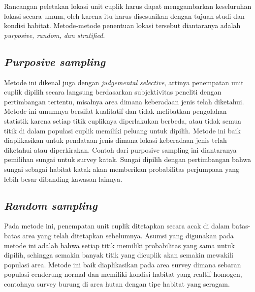 \documentclass[
  oneside]{book}
\begin{document}
Rancangan peletakan lokasi unit cuplik harus dapat menggambarkan keseluruhan lokasi secara umum, oleh karena itu harus disesuaikan dengan tujuan studi dan kondisi habitat. Metode-metode penentuan lokasi tersebut diantaranya adalah \emph{purposive, random, dan stratified}.

\hypertarget{purposive-sampling}{%
\subsection*{\texorpdfstring{\emph{Purposive sampling}}{Purposive sampling}}\label{purposive-sampling}}

Metode ini dikenal juga dengan \emph{judgemental selective}, artinya penempatan unit cuplik dipilih secara langsung berdasarkan subjektivitas peneliti dengan pertimbangan tertentu, misalnya area dimana keberadaan jenis telah diketahui. Metode ini umumnya bersifat kualitatif dan tidak melibatkan pengolahan statistik karena setiap titik cupliknya diperlakukan berbeda, atau tidak semua titik di dalam populasi cuplik memiliki peluang untuk dipilih. Metode ini baik diaplikasikan untuk pendataan jenis dimana lokasi keberadaan jenis telah diketahui atau diperkirakan. Contoh dari purposive sampling ini diantaranya pemilihan sungai untuk survey katak. Sungai dipilih dengan pertimbangan bahwa sungai sebagai habitat katak akan memberikan probabilitas perjumpaan yang lebih besar dibanding kawasan lainnya.

\hypertarget{random-sampling}{%
\subsection*{\texorpdfstring{\emph{Random sampling }}{Random sampling }}\label{random-sampling}}

Pada metode ini, penempatan unit cuplik ditetapkan secara acak di dalam batas-batas area yang telah ditetapkan sebelumnya. Asumsi yang digunakan pada metode ini adalah bahwa setiap titik memiliki probabilitas yang sama untuk dipilih, sehingga semakin banyak titik yang dicuplik akan semakin mewakili populasi area. Metode ini baik diaplikasikan pada area survey dimana sebaran populasi cenderung normal dan memiliki kondisi habitat yang realtif homogen, contohnya survey burung di area hutan dengan tipe habitat yang seragam.
\end{document}
